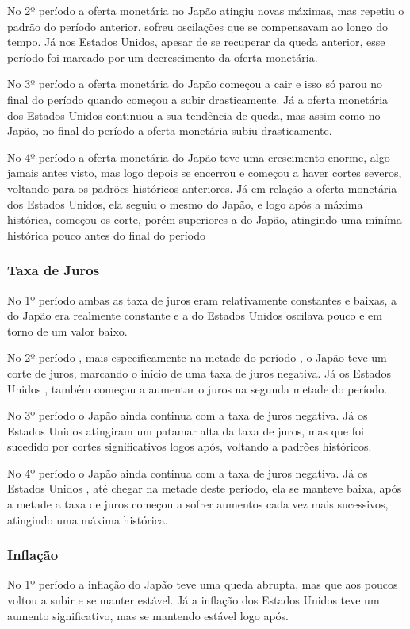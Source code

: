\documentclass[a4paper,12pt]{article}[abntex2]
\begin{document}
No 2º período a oferta monetária no Japão atingiu novas máximas, mas repetiu o padrão do período anterior, sofreu oscilações que se compensavam ao longo do tempo. Já nos Estados Unidos, apesar de se recuperar da queda anterior, esse período foi marcado por um decrescimento da oferta monetária. 

No 3º período a oferta monetária do Japão começou a cair e isso só parou no final do período quando começou a subir drasticamente. Já a oferta monetária dos Estados Unidos continuou a sua tendência de queda, mas assim como no Japão, no final do período a oferta monetária subiu drasticamente.

No 4º período a oferta monetária do Japão teve uma crescimento enorme, algo jamais antes visto, mas logo depois se encerrou e começou a haver cortes severos, voltando para os padrões históricos anteriores. Já em relação a oferta monetária dos Estados Unidos, ela seguiu o mesmo do Japão, e logo após a máxima histórica, começou os corte, porém superiores a do Japão, atingindo uma míníma histórica pouco antes do final do período

\subsubsection{\textbf{Taxa de Juros}}
No 1º período ambas as taxa de juros eram relativamente constantes e baixas, a do Japão era realmente constante e a do Estados Unidos oscilava pouco e em torno de um valor baixo.

No 2º período , mais especificamente na metade do período , o Japão teve um corte de juros, marcando o início de uma taxa de juros negativa. Já os Estados Unidos , também começou a aumentar o juros na segunda metade do período.

No 3º período o Japão ainda continua com a taxa de juros negativa. Já os Estados Unidos atingiram um patamar alta da taxa de juros, mas que foi sucedido por cortes significativos logos após, voltando a padrões históricos.

No 4º período o Japão ainda continua com a taxa de juros negativa. Já os Estados Unidos , até chegar na metade deste período, ela se manteve baixa, após a metade a taxa de juros começou a sofrer aumentos cada vez mais sucessivos, atingindo uma máxima histórica.

\subsubsection{\textbf{Inflação}}
No 1º período a inflação do Japão teve uma queda abrupta, mas que aos poucos voltou a subir e se manter estável. Já a inflação dos Estados Unidos teve um aumento significativo, mas se mantendo estável logo após.
\end{document}
